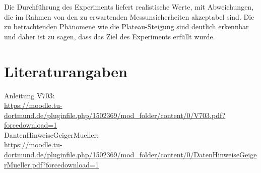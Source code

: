 \noindent Die Durchführung des Experiments liefert realistische Werte,
mit Abweichungen, die im Rahmen von den zu erwartenden Messunsicherheiten akzeptabel sind.
Die zu betrachtenden Phänomene wie die Plateau-Steigung sind deutlich erkennbar 
und daher ist zu sagen, dass das Ziel des Experiments erfüllt wurde.

\section{Literaturangaben}

Anleitung V703:\\
\url{https://moodle.tu-dortmund.de/pluginfile.php/1502369/mod_folder/content/0/V703.pdf?forcedownload=1}\\
DantenHinweiseGeigerMueller:\\
\url{https://moodle.tu-dortmund.de/pluginfile.php/1502369/mod_folder/content/0/DatenHinweiseGeigerMueller.pdf?forcedownload=1}\\

